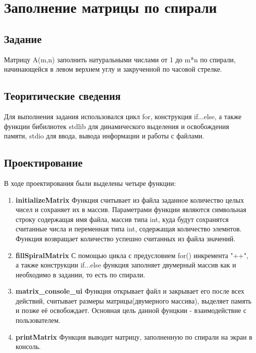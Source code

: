 \documentclass[12pt,a4paper]{report}
\begin{document}
\section{Заполнение матрицы по спирали}
\subsection{Задание}
\hspace{\parindent}
Матрицу A(m,n) заполнить натуральными числами от 1 до m*n по спирали, начинающейся в левом верхнем углу и закрученной по часовой стрелке.

\subsection{Теоритические сведения}
\hspace{\parindent}
Для выполнения задания использовался цикл for, конструкция if...else, а также функции бибилиотек stdlib для динамического выделения и освобождения памяти, stdio для ввода, вывода информации и работы с файлами.

\subsection{Проектирование}
\hspace{\parindent} 
В ходе проектирования были выделены четыре функции:
\begin{enumerate}
	\item \textbf{initializeMatrix}
	Функция считывает из файла заданное количество целых чисел и сохраняет их в массив.
	Параметрами функции являются символьная строку содержащая имя файла, массив типа int, куда будут сохранятся считанные числа и переменная типа int, содержащая количество элемнтов.
	Функция возвращает количество успешно считанных из файла значений. 
	\item \textbf{fillSpiralMatrix}	
	С помощью цикла с предусловием for() инкремента "++", а также конструкции if...else функция заполняет двумерный массив как и необходимо в задании, то есть по спирали. 
	\item \textbf{matrix\_console\_ui}
	Функция открывает файл и закрывает его после всех действий, считывает размеры матрицы(двумерного массива), выделяет память и позже её освобождает. Основная цель данной фунцкии - взаимодействие с пользователем.
	\item \textbf{printMatrix}	
	Функция выводит матрицу, заполненную по спирали на экран в консоль.
\end{enumerate}
\end{document}
